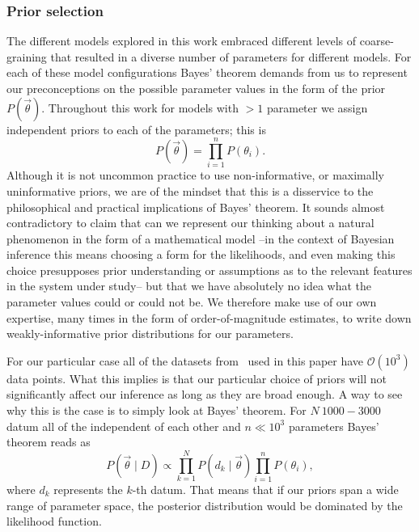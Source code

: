 \subsubsection{Prior selection}
The different models explored in this work embraced different levels of
coarse-graining that resulted in a diverse number of parameters for different
models. For each of these model configurations Bayes' theorem demands from us to
represent our preconceptions on the possible parameter values in the form of the
prior $P(\vec{\theta})$. Throughout this work for models with $> 1$ parameter we
assign independent priors to each of the parameters; this is
\begin{equation}
P(\vec{\theta}) = \prod_{i=1}^n P(\theta_i).
\end{equation}
Although it is not uncommon practice to use non-informative, or maximally
uninformative priors, we are of the mindset that this is a disservice to the
philosophical and practical implications of Bayes' theorem. It sounds almost
contradictory to claim that can we represent our thinking about a natural
phenomenon in the form of a mathematical model --in the context of Bayesian
inference this means choosing a form for the likelihoods, and even making
this choice presupposes prior understanding or assumptions as to the
relevant features in the system under study-- but that we have absolutely
no idea what the parameter values could or could not be. We therefore make
use of our own expertise, many times in the form of order-of-magnitude
estimates, to write down weakly-informative prior distributions
for our parameters.

For our particular case all of the datasets from~\cite{Jones2014} used in this
paper have $\mathcal{O}(10^3)$ data points. What this implies is that our
particular choice of priors will not significantly affect our inference as long
as they are broad enough. A way to see why this is the case is to simply look at
Bayes' theorem. For $N ~ 1000-3000$ datum all of the independent of each other
and $n \ll 10^3$ parameters Bayes' theorem reads as
\begin{equation}
P(\vec{\theta} \mid D) \propto \prod_{k=1}^{N} P(d_k \mid \vec{\theta})
\prod_{i=1}^n P(\theta_i),
\end{equation}
where $d_k$ represents the $k$-th datum. That means that if our priors span a
wide range of parameter space, the posterior distribution would be dominated by
the likelihood function.


